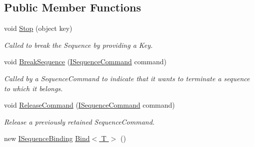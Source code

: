 \subsection*{Public Member Functions}
\begin{DoxyCompactItemize}
\item 
\hypertarget{interfacestrange_1_1extensions_1_1sequencer_1_1api_1_1_i_sequencer_a567ef7d1f049ee678bc034b05a52c472}{void \hyperlink{interfacestrange_1_1extensions_1_1sequencer_1_1api_1_1_i_sequencer_a567ef7d1f049ee678bc034b05a52c472}{Stop} (object key)}\label{interfacestrange_1_1extensions_1_1sequencer_1_1api_1_1_i_sequencer_a567ef7d1f049ee678bc034b05a52c472}

\begin{DoxyCompactList}\small\item\em Called to break the Sequence by providing a Key. \end{DoxyCompactList}\item 
\hypertarget{interfacestrange_1_1extensions_1_1sequencer_1_1api_1_1_i_sequencer_aa915e265e0fecb81a6a4f3d8e15a77cf}{void \hyperlink{interfacestrange_1_1extensions_1_1sequencer_1_1api_1_1_i_sequencer_aa915e265e0fecb81a6a4f3d8e15a77cf}{Break\-Sequence} (\hyperlink{interfacestrange_1_1extensions_1_1sequencer_1_1api_1_1_i_sequence_command}{I\-Sequence\-Command} command)}\label{interfacestrange_1_1extensions_1_1sequencer_1_1api_1_1_i_sequencer_aa915e265e0fecb81a6a4f3d8e15a77cf}

\begin{DoxyCompactList}\small\item\em Called by a Sequence\-Command to indicate that it wants to terminate a sequence to which it belongs. \end{DoxyCompactList}\item 
void \hyperlink{interfacestrange_1_1extensions_1_1sequencer_1_1api_1_1_i_sequencer_a82319428df4be5e5059493c25c0e6aa5}{Release\-Command} (\hyperlink{interfacestrange_1_1extensions_1_1sequencer_1_1api_1_1_i_sequence_command}{I\-Sequence\-Command} command)
\begin{DoxyCompactList}\small\item\em Release a previously retained Sequence\-Command. \end{DoxyCompactList}\item 
\hypertarget{interfacestrange_1_1extensions_1_1sequencer_1_1api_1_1_i_sequencer_a89d1866b3c64fe9d95c62c85bfb5e252}{new \hyperlink{interfacestrange_1_1extensions_1_1sequencer_1_1api_1_1_i_sequence_binding}{I\-Sequence\-Binding} \hyperlink{interfacestrange_1_1extensions_1_1sequencer_1_1api_1_1_i_sequencer_a89d1866b3c64fe9d95c62c85bfb5e252}{Bind$<$ T $>$} ()}\label{interfacestrange_1_1extensions_1_1sequencer_1_1api_1_1_i_sequencer_a89d1866b3c64fe9d95c62c85bfb5e252}


\end{DoxyCompactItemize}
